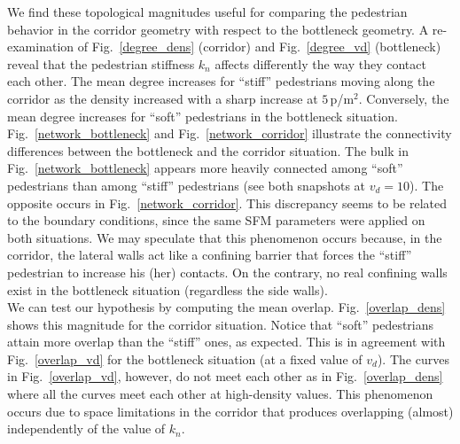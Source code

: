 \documentclass[preprint,12pt]{elsarticle}
\begin{document}
We find these topological magnitudes useful for comparing the  pedestrian
behavior in the  corridor geometry with respect to the bottleneck geometry. A
re-examination of  Fig.~\ref{degree_dens} (corridor) and Fig.~\ref{degree_vd}
(bottleneck) reveal  that the pedestrian stiffness $k_n$ affects differently the
way they contact  each other. The mean degree increases for ``stiff''
pedestrians moving along  the corridor as the density increased with a sharp
increase at  $5\,$p/m$^2$. Conversely, the mean degree  increases for ``soft''
pedestrians in the bottleneck situation.\\

Fig.~\ref{network_bottleneck} and  Fig.~\ref{network_corridor} illustrate the
connectivity differences between  the bottleneck and the corridor situation. The
bulk in  Fig.~\ref{network_bottleneck} appears more heavily connected among
``soft''  pedestrians than among ``stiff'' pedestrians (see both snapshots at
$v_d=10$).  The opposite occurs in Fig.~\ref{network_corridor}. This discrepancy
seems to  be related to the boundary conditions, since the same SFM parameters
were  applied on both situations. We may speculate that this phenomenon occurs
because, in the corridor, the lateral walls act like a  confining barrier that
forces the ``stiff'' pedestrian to increase his (her) contacts. On the contrary,
no real confining walls exist in the bottleneck situation (regardless the side
walls). \\

We can test our hypothesis by computing the mean overlap. 
Fig.~\ref{overlap_dens} shows this magnitude for the corridor situation. Notice 
that ``soft'' pedestrians attain more overlap than the ``stiff'' 
ones, as expected. This is in agreement with Fig.~\ref{overlap_vd} for the 
bottleneck situation (at a fixed value of $v_d$). The curves in 
Fig.~\ref{overlap_vd}, however, do not meet each other as in  
Fig.~\ref{overlap_dens} where all the curves meet each other at
high-density values. This phenomenon occurs due to space limitations
in the corridor that produces overlapping (almost) independently of 
the value of $k_n$. \\
\end{document}

